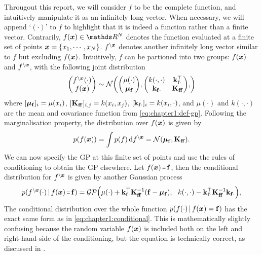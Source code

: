 Througout this report, we will consider $f$ to be the complete function, and intuitively manipulate it as an infinitely long vector. When necessary, we will append `$(\cdot)$' to $f$ to highlight that it is indeed a function rather than a finite vector. Contrarily, $f(\vx) \in \Reals^N$ denotes the function evaluated at a finite set of points $\bm{x} = \{x_1, \cdots, x_N\}$. $f^{\setminus \bm{x}}$ denotes another infinitely long vector similar to $f$ but excluding $f(\bm{x})$. Intuitively, $f$ can be partioned into two groups: $f(\bm{x})$ and $f^{\setminus \bm{x}}$, with the following joint distribution
\begin{equation}
  \begin{pmatrix} f^{\setminus \vx}(\cdot)\\ f(\vx) \end{pmatrix} \sim \NormDist{
    \begin{pmatrix} \mu(\cdot) \\ \vmu_{\vf} \end{pmatrix},
    \begin{pmatrix} k(\cdot, \cdot)  & \kfx\transpose \\ \kfx & \Kff \end{pmatrix},
  }
\end{equation}
where $[\boldsymbol{\mu}_{\mathbf{f}}]_{i} = \mu(x_i)$, $[\mathbf{{K}}_{\mathbf{f} \mathbf{f}}]_{i,j} = k(x_i, x_j)$, $[\mathbf{k}_{\mathbf{f} \cdot}]_i = k(x_i, \cdot)$, and $\mu(\cdot)$ and $k(\cdot, \cdot)$ are the mean and covariance function from \cref{eq:chapter1:def-gp}. Following the marginalisation property, the distribution over $f(\bm{x})$ is given by
\begin{equation}
p(f(\vx)) = \int p(f)\,\calcd{f^{\setminus \vx}} = \NormDist{\vmu_{\vf}, \Kff}.
\end{equation}
We can now specify the GP at this finite set of points and use the rules of conditioning to obtain the GP elsewhere. Let $f(\vx) \shorteq \vf$, then the conditional distribution for $f^{\setminus \bm{x}}$ is given by another Gaussian process
\begin{equation}
  \label{eq:chapter1:conditional}
  p(f^{\setminus \vx}(\cdot) \given f(\vx) \shorteq \vf) = \GP\Big(\mu(\cdot) + \kfx^\top \Kff^{-1} (\vf - \vmu_{\vf}),\ \ k(\cdot, \cdot) -  \kfx^\top \Kff^{-1} \kfx\Big),
\end{equation}
The conditional distribution over the whole function $p(f(\cdot) \,|\, f(\bm{x}) = \mathbf{f})$ has the exact same form as in \cref{eq:chapter1:conditional}. This is mathematically slightly confusing because the random variable $f(\bm{x})$ is included both on the left and right-hand-side of the conditioning, but the equation is technically correct, as discussed in \citet{matthews16,van2020framework,Leibfried2020Tutorial}.

